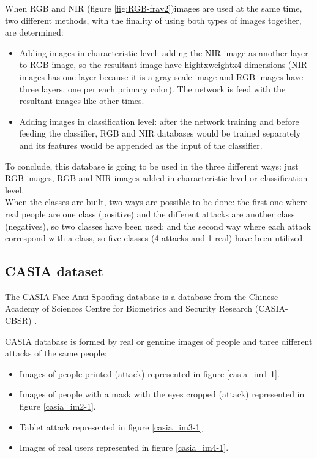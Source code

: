 When RGB and NIR (figure \ref{fig:RGB-frav2})images are used at the same time, two different methods, with the finality of using both types of images together, are determined:
\begin{itemize}
\item Adding images in characteristic level: adding the NIR image as another layer to RGB image, so the resultant image have hightxweightx4 dimensions (NIR images has one layer because it is a gray scale image and RGB images have three layers, one per each primary color). The network is feed with the resultant images like other times.
\item Adding images in classification level: after the network training and before feeding the classifier, RGB and NIR databases would be trained separately and its features would be appended as the input of the classifier.
\end{itemize}

To conclude, this database is going to be used in the three different ways: just RGB images, RGB and NIR images added in characteristic level or classification level.\\

When the classes are built, two ways are possible to be done: the first one where real people are one class (positive) and the different attacks are another class (negatives), so two classes have been used; and the second way where each attack correspond with a class, so five classes (4 attacks and 1 real) have been utilized.\\

\subsection{CASIA dataset}
The CASIA Face Anti-Spoofing database is a database from the Chinese Academy of Sciences Centre for Biometrics and Security Research (CASIA-CBSR) \cite{Casiadatbase}.

CASIA database is formed by real or genuine images of people and three different attacks of the same people:
\begin{itemize}[itemsep=2pt,topsep=8pt,parsep=0pt,partopsep=20pt]
 \item Images of people printed (attack) represented in figure \ref{casia_im1-1}.
 \item Images of people with a mask with the eyes cropped (attack) represented in figure \ref{casia_im2-1}.
 \item Tablet attack represented in figure \ref{casia_im3-1}
\item Images of real users represented in figure \ref{casia_im4-1}.
 \end{itemize}

